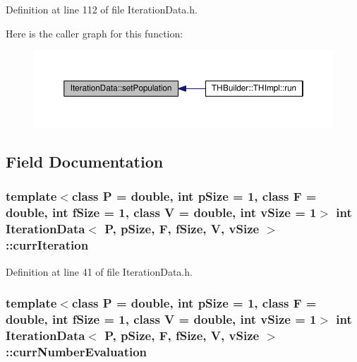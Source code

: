 Definition at line 112 of file Iteration\+Data.\+h.



Here is the caller graph for this function\+:
\nopagebreak
\begin{figure}[H]
\begin{center}
\leavevmode
\includegraphics[width=350pt]{structIterationData_a891c2a7e6d8f1134dece070ecab16afd_icgraph}
\end{center}
\end{figure}




\subsection{Field Documentation}
\subsubsection[{\texorpdfstring{curr\+Iteration}{currIteration}}]{\setlength{\rightskip}{0pt plus 5cm}template$<$class P = double, int p\+Size = 1, class F = double, int f\+Size = 1, class V = double, int v\+Size = 1$>$ int {\bf Iteration\+Data}$<$ P, p\+Size, F, f\+Size, V, v\+Size $>$\+::curr\+Iteration}\hypertarget{structIterationData_a4868b1453ea6cb512ca4b3b91aa9aa46}{}\label{structIterationData_a4868b1453ea6cb512ca4b3b91aa9aa46}


Definition at line 41 of file Iteration\+Data.\+h.

\subsubsection[{\texorpdfstring{curr\+Number\+Evaluation}{currNumberEvaluation}}]{\setlength{\rightskip}{0pt plus 5cm}template$<$class P = double, int p\+Size = 1, class F = double, int f\+Size = 1, class V = double, int v\+Size = 1$>$ int {\bf Iteration\+Data}$<$ P, p\+Size, F, f\+Size, V, v\+Size $>$\+::curr\+Number\+Evaluation}\hypertarget{structIterationData_a3ebd4afd41be1657a42d79b053896a43}{}\label{structIterationData_a3ebd4afd41be1657a42d79b053896a43}


